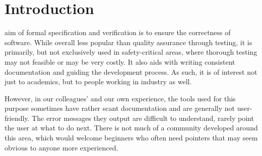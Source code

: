 \documentclass[12pt,journal,duplex]{IEEEtran}
\begin{document}

	\maketitle


	\IEEEdisplaynotcompsoctitleabstractindextext


	\IEEEpeerreviewmaketitle
	\clearpage
	\tableofcontents
	\clearpage
	\twocolumn
	\section{Introduction}
	 aim of formal specification and verification is to ensure the correctness of software. While overall less popular than quality assurance through testing, it is primarily, but not exclusively used in safety-critical areas, where thorough testing may not feasible or may be very costly. It also aids with writing consistent documentation and guiding the development process. As such, it is of interest not just to academics, but to people working in industry as well.

	However, in our colleagues' and our own experience, the tools used for this purpose sometimes have rather scant documentation and are generally not user-friendly. The error messages they output are difficult to understand, rarely point the user at what to do next. There is not much of a community developed around this area, which would welcome beginners who often need pointers that may seem obvious to anyone more experienced.
\end{document}
